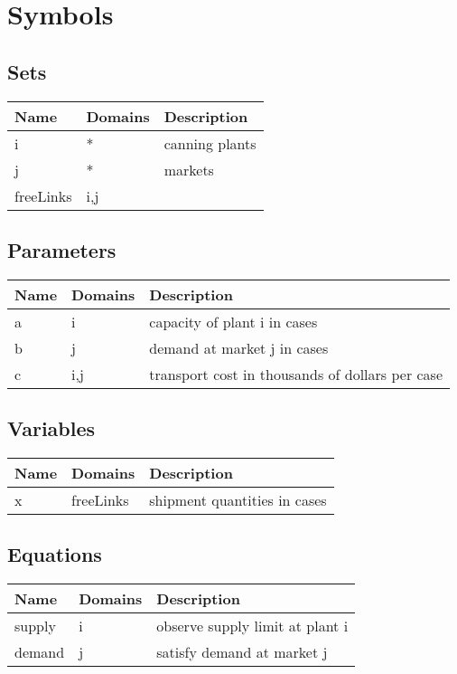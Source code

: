 \documentclass[11pt]{article}
\begin{document}
\section*{Symbols}


\subsection*{Sets}
\begin{tabularx}{\textwidth}{| l | l | X |}
\hline
\textbf{Name} & \textbf{Domains} & \textbf{Description}\\
\hline
\endhead

i & * & canning plants\\
j & * & markets\\
freeLinks & i,j & \\
\hline
\end{tabularx}
\subsection*{Parameters}
\begin{tabularx}{\textwidth}{| l | l | X |}
\hline
\textbf{Name} & \textbf{Domains} & \textbf{Description}\\
\hline
\endhead

a & i & capacity of plant i in cases\\
b & j & demand at market j in cases\\
c & i,j & transport cost in thousands of dollars per case\\
\hline
\end{tabularx}
\subsection*{Variables}
\begin{tabularx}{\textwidth}{| l | l | X |}
\hline
\textbf{Name} & \textbf{Domains} & \textbf{Description}\\
\hline
\endhead

x & freeLinks & shipment quantities in cases\\
\hline
\end{tabularx}
\subsection*{Equations}
\begin{tabularx}{\textwidth}{| l | l | X |}
\hline
\textbf{Name} & \textbf{Domains} & \textbf{Description}\\
\hline
\endhead

supply & i & observe supply limit at plant i\\
demand & j & satisfy demand at market j\\
\hline
\end{tabularx}
\end{document}
